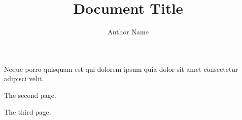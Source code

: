 \documentclass[12pt]{article}
\title{Document Title}
\author{Author Name}
\date{}
\begin{document}
\maketitle

Neque porro quisquam est qui dolorem ipsum quia dolor sit amet consectetur adipisci velit.

\newpage

The second page.

\newpage

The third page.
\end{document}
